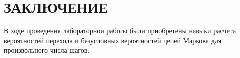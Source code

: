 \section*{ЗАКЛЮЧЕНИЕ}

В ходе проведения лабораторной работы были приобретены навыки расчета
вероятностей перехода и безусловных вероятностей цепей Маркова
для произвольного числа шагов.

\newpage
